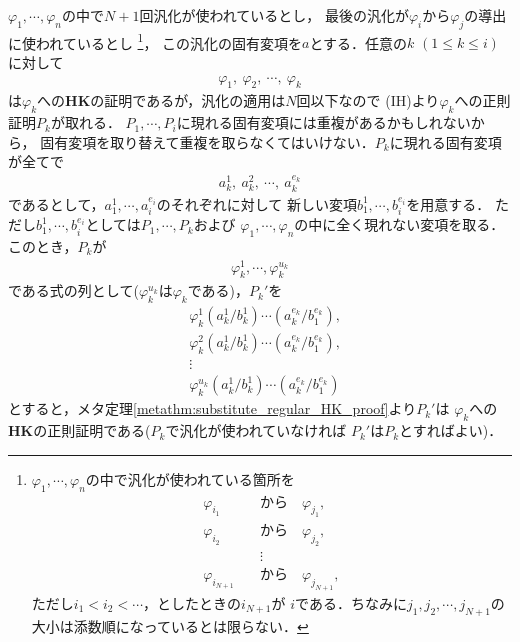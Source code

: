 \begin{metaprf}
\begin{description}
				$\varphi_{1},\cdots,\varphi_{n}$の中で$N+1$回汎化が使われているとし，
				最後の汎化が$\varphi_{i}$から$\varphi_{j}$の導出に使われているとし
				\footnote{
					$\varphi_{1},\cdots,\varphi_{n}$の中で汎化が使われている箇所を
					\begin{align}
						\varphi_{i_{1}} \quad &\mbox{から} \quad \varphi_{j_{1}}, \\
						\varphi_{i_{2}} \quad &\mbox{から} \quad \varphi_{j_{2}}, \\
						&\vdots \\
						\varphi_{i_{N+1}} \quad &\mbox{から} \quad \varphi_{j_{N+1}},
					\end{align}
					ただし$i_{1}<i_{2}<\cdots$，としたときの$i_{N+1}$が
					$i$である．ちなみに$j_{1},j_{2},\cdots,j_{N+1}$の
					大小は添数順になっているとは限らない．
				}，
				この汎化の固有変項を$a$とする．任意の$k$ $(1 \leq k \leq i)$に対して
				\begin{align}
					\varphi_{1},\ \varphi_{2},\ \cdots,\ \varphi_{k}
				\end{align}
				は$\varphi_{k}$への{\bf HK}の証明であるが，汎化の適用は$N$回以下なので
				(IH)より$\varphi_{k}$への正則証明$P_{k}$が取れる．
				$P_{1},\cdots,P_{i}$に現れる固有変項には重複があるかもしれないから，
				固有変項を取り替えて重複を取らなくてはいけない．$P_{k}$に現れる固有変項が全てで
				\begin{align}
					a_{k}^{1},\ a_{k}^{2},\ \cdots,\ a_{k}^{e_{k}}
				\end{align}
				であるとして，$a_{1}^{1},\cdots,a_{i}^{e_{i}}$のそれぞれに対して
				新しい変項$b_{1}^{1},\cdots,b_{i}^{e_{i}}$を用意する．
				ただし$b_{1}^{1},\cdots,b_{i}^{e_{i}}$としては$P_{1},\cdots,P_{k}$および
				$\varphi_{1},\cdots,\varphi_{n}$の中に全く現れない変項を取る．
				このとき，$P_{k}$が
				\begin{align}
					\varphi_{k}^{1},\cdots,\varphi_{k}^{u_{k}}
				\end{align}
				である式の列として($\varphi_{k}^{u_{k}}$は$\varphi_{k}$である)，$P_{k}'$を
				\begin{align}
					&\varphi_{k}^{1}(a_{k}^{1}/b_{k}^{1})\cdots(a_{k}^{e_{k}}/b_{1}^{e_{k}}), \\
					&\varphi_{k}^{2}(a_{k}^{1}/b_{k}^{1})\cdots(a_{k}^{e_{k}}/b_{1}^{e_{k}}), \\
					&\vdots \\ 
					&\varphi_{k}^{u_{k}}(a_{k}^{1}/b_{k}^{1})\cdots(a_{k}^{e_{k}}/b_{1}^{e_{k}})
				\end{align}
				とすると，メタ定理\ref{metathm:substitute_regular_HK_proof}より$P_{k}'$は
				$\varphi_{k}$への{\bf HK}の正則証明である($P_{k}$で汎化が使われていなければ
				$P_{k}'$は$P_{k}$とすればよい)．
				

\end{description}
\end{metaprf}
